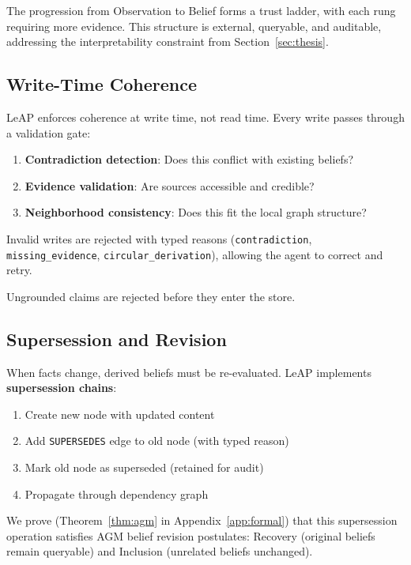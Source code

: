 \documentclass[11pt,letterpaper]{article}
\begin{document}
The progression from Observation to Belief forms a trust ladder, with each rung requiring more evidence. This structure is external, queryable, and auditable, addressing the interpretability constraint from Section~\ref{sec:thesis}.

\subsection{Write-Time Coherence}

LeAP enforces coherence at write time, not read time. Every write passes through a validation gate:

\begin{enumerate}[noitemsep]
    \item \textbf{Contradiction detection}: Does this conflict with existing beliefs?
    \item \textbf{Evidence validation}: Are sources accessible and credible?
    \item \textbf{Neighborhood consistency}: Does this fit the local graph structure?
\end{enumerate}

Invalid writes are rejected with typed reasons (\texttt{contradiction}, \texttt{missing\_evidence}, \texttt{circular\_derivation}), allowing the agent to correct and retry.

Ungrounded claims are rejected before they enter the store.

\subsection{Supersession and Revision}

When facts change, derived beliefs must be re-evaluated. LeAP implements \textbf{supersession chains}:

\begin{enumerate}[noitemsep]
    \item Create new node with updated content
    \item Add \texttt{SUPERSEDES} edge to old node (with typed reason)
    \item Mark old node as superseded (retained for audit)
    \item Propagate through dependency graph
\end{enumerate}

We prove (Theorem~\ref{thm:agm} in Appendix~\ref{app:formal}) that this supersession operation satisfies AGM belief revision postulates: Recovery (original beliefs remain queryable) and Inclusion (unrelated beliefs unchanged).
\end{document}
